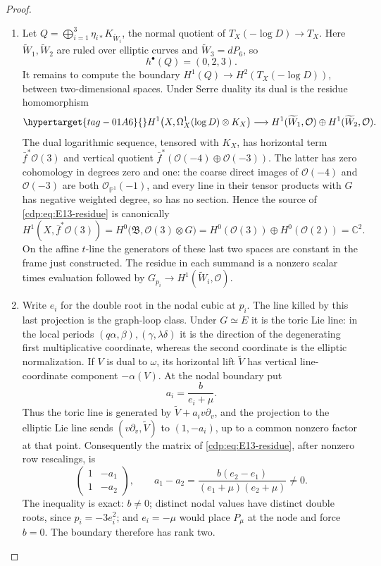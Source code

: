 \begin{proof}
\begin{enumerate}[label={$\langle1\rangle$\arabic*.},leftmargin=*]
\item Let $Q=\bigoplus_{i=1}^3\eta_{i*}K_{\widetilde W_i}$, the normal
quotient of $T_X(-\log D)\to T_X$. Here
$\widetilde W_1,\widetilde W_2$ are ruled over elliptic curves and
$\widetilde W_3=dP_6$, so
\[
 h^\bullet(Q)=(0,2,3).
\]
It remains to compute the boundary
$H^1(Q)\to H^2(T_X(-\log D))$, between two-dimensional spaces.
Under Serre duality its dual is the residue homomorphism
\begin{equation}\hypertarget{tag-01A6}{}\label{cdp:eq:E13-residue}
 H^1\bigl(X,\Omega_X^1(\log D)\otimes K_X\bigr)
 \longrightarrow
 H^1(\widetilde W_1,\mathcal O)\oplus
 H^1(\widetilde W_2,\mathcal O).
\end{equation}
The dual logarithmic sequence, tensored with $K_X$, has horizontal
term $\bar f^*\mathcal O(3)$ and vertical quotient
$\bar f^*(\mathcal O(-4)\oplus\mathcal O(-3))$.
The latter has zero cohomology in degrees zero and one: the coarse
direct images of $\mathcal O(-4)$ and $\mathcal O(-3)$ are both
$\mathcal O_{\mathbb P^1}(-1)$, and every line in their tensor
products with $G$ has negative weighted degree, so has no section.
Hence the
source of \eqref{cdp:eq:E13-residue} is canonically
\[
 H^1(X,\bar f^*\mathcal O(3))
 =H^0\bigl(\mathfrak B,\mathcal O(3)\otimes G\bigr)
 =H^0(\mathcal O(3))\oplus H^0(\mathcal O(2))=\mathbb C^2.
\]
On the affine $t$-line the generators of these last two spaces are
constant in the frame just constructed. The residue in each
summand is a nonzero scalar times evaluation followed by
$G_{p_i}\to H^1(\widetilde W_i,\mathcal O)$.

\item Write $e_i$ for the double root in the nodal cubic at $p_i$.
The line killed by this last projection is the graph-loop class.
Under $G\simeq E$ it is the toric Lie line: in the local periods
$(q\alpha,\beta),(\gamma,\lambda\delta)$ it is the direction
of the degenerating first multiplicative coordinate, whereas the
second coordinate is the elliptic normalization. If $V$ is dual to
$\omega$, its horizontal lift $\widetilde V$ has vertical
line-coordinate component $-\alpha(V)$. At the nodal boundary put
\[
 a_i=\frac{b}{e_i+\mu}.
\]
Thus the toric line is generated by
$\widetilde V+a_i v\partial_v$, and the projection to the elliptic
Lie line sends $(v\partial_v,\widetilde V)$ to $(1,-a_i)$, up to
a common nonzero factor at that point. Consequently the matrix of
\eqref{cdp:eq:E13-residue}, after nonzero row rescalings, is
\[
 \begin{pmatrix}1&-a_1\\1&-a_2\end{pmatrix},\qquad
 a_1-a_2=\frac{b(e_2-e_1)}{(e_1+\mu)(e_2+\mu)}\ne0.
\]
The inequality is exact: $b\ne0$; distinct nodal values have
distinct double roots, since $p_i=-3e_i^2$; and $e_i=-\mu$ would
place $P_\mu$ at the node and force $b=0$. The boundary therefore
has rank two.


\end{enumerate}
\end{proof}
